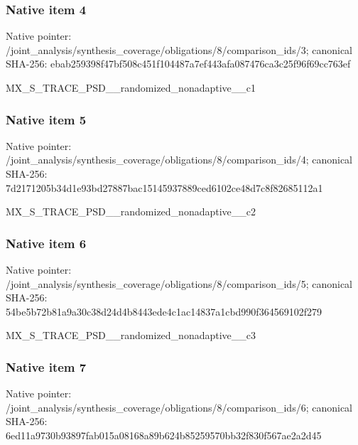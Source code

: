 \documentclass[10pt,a4paper]{article}
\begin{document}
\subsubsection{Native item 4}
Native pointer: /joint\_\allowbreak{}analysis/synthesis\_\allowbreak{}coverage/obligations/8/comparison\_\allowbreak{}ids/3; canonical SHA-256: ebab259398f47bf508c451f104487a7ef443afa087476ca3c25f96f69cc763ef

\begingroup\raggedright\sloppy MX\_\allowbreak{}S\_\allowbreak{}TRACE\_\allowbreak{}PSD\_\allowbreak{}\_\allowbreak{}randomized\_\allowbreak{}nonadaptive\_\allowbreak{}\_\allowbreak{}c1\par\endgroup

\subsubsection{Native item 5}
Native pointer: /joint\_\allowbreak{}analysis/synthesis\_\allowbreak{}coverage/obligations/8/comparison\_\allowbreak{}ids/4; canonical SHA-256: 7d2171205b34d1e93bd27887bac15145937889ced6102ce48d7c8f82685112a1

\begingroup\raggedright\sloppy MX\_\allowbreak{}S\_\allowbreak{}TRACE\_\allowbreak{}PSD\_\allowbreak{}\_\allowbreak{}randomized\_\allowbreak{}nonadaptive\_\allowbreak{}\_\allowbreak{}c2\par\endgroup

\subsubsection{Native item 6}
Native pointer: /joint\_\allowbreak{}analysis/synthesis\_\allowbreak{}coverage/obligations/8/comparison\_\allowbreak{}ids/5; canonical SHA-256: 54be5b72b81a9a30c38d24d4b8443ede4c1ac14837a1cbd990f364569102f279

\begingroup\raggedright\sloppy MX\_\allowbreak{}S\_\allowbreak{}TRACE\_\allowbreak{}PSD\_\allowbreak{}\_\allowbreak{}randomized\_\allowbreak{}nonadaptive\_\allowbreak{}\_\allowbreak{}c3\par\endgroup

\subsubsection{Native item 7}
Native pointer: /joint\_\allowbreak{}analysis/synthesis\_\allowbreak{}coverage/obligations/8/comparison\_\allowbreak{}ids/6; canonical SHA-256: 6ed11a9730b93897fab015a08168a89b624b85259570bb32f830f567ae2a2d45
\end{document}
